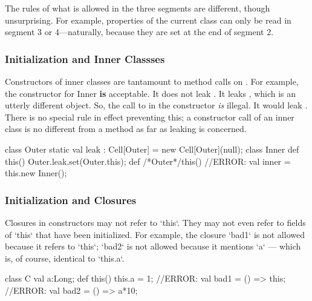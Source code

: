 The rules of what is allowed in the three segments are different, though
unsurprising.  For example, properties of the current class can only be read
in segment 3 or 4---naturally, because they are set at the end of segment 2.

\subsubsection{Initialization and Inner Classses}

Constructors of inner classes are tantamount to method calls on .
For example, the constructor for Inner {\bf is} acceptable.  It does not leak
.  It leaks , which is an utterly different object.
So, the call to  in the  constructor {\em
is} illegal.  It would leak .  There is no special rule in effect
preventing this; a constructor call of an inner class is no
different from a method as far as leaking is concerned.
\begin{xten}
class Outer {
  static val leak : Cell[Outer] = new Cell[Outer](null);
  class Inner {
     def this() {Outer.leak.set(Outer.this);}
  }
  def /*Outer*/this() {
     //ERROR: val inner = this.new Inner();
  }
}
\end{xten}
%



\subsubsection{Initialization and Closures}

Closures in constructors may not refer to \xcd`this`.  They may not even refer
to fields of \xcd`this` that have been initialized.   For example, the
closure \xcd`bad1` is not allowed because it refers to \xcd`this`; \xcd`bad2`
is not allowed because it mentions \xcd`a` --- which is, of course, identical
to \xcd`this.a`. 

\begin{xten}
class C {
  val a:Long;
  def this() {
    this.a = 1;
    //ERROR: val bad1 = () => this; 
    //ERROR: val bad2 = () => a*10;
  }
}
\end{xten}
%


